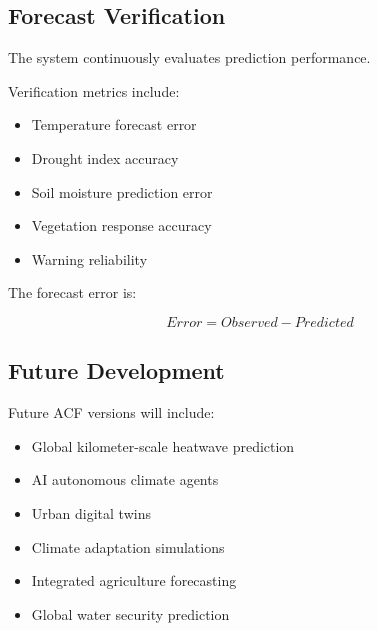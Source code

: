 
\subsection{Forecast Verification}

The system continuously evaluates prediction performance.

Verification metrics include:

\begin{itemize}

\item Temperature forecast error

\item Drought index accuracy

\item Soil moisture prediction error

\item Vegetation response accuracy

\item Warning reliability

\end{itemize}


The forecast error is:

\[
Error =
Observed
-
Predicted
\]



\subsection{Future Development}

Future ACF versions will include:

\begin{itemize}

\item Global kilometer-scale heatwave prediction

\item AI autonomous climate agents

\item Urban digital twins

\item Climate adaptation simulations

\item Integrated agriculture forecasting

\item Global water security prediction

\end{itemize}



